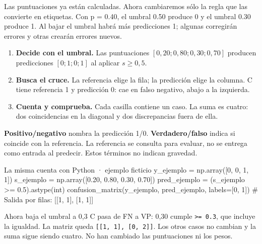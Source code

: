\label{bloque-8}

Las puntuaciones ya están calculadas. Ahora cambiaremos sólo la regla que las convierte en etiquetas. Con p = 0.40, el umbral 0.50 produce 0 y el umbral 0.30 produce 1. Al bajar el umbral habrá más predicciones 1; algunas corregirán errores y otras crearán errores nuevos.


\begin{enumerate}
\item \textbf{Decide con el umbral.} Las puntuaciones \([0,20;0,80;0,30;0,70]\) producen predicciones \([0;1;0;1]\) al aplicar \(s\geq0,5\).
\item \textbf{Busca el cruce.} La referencia elige la fila; la predicción elige la columna. C tiene referencia 1 y predicción 0: cae en falso negativo, abajo a la izquierda.
\item \textbf{Cuenta y comprueba.} Cada casilla contiene un caso. La suma es cuatro: dos coincidencias en la diagonal y dos discrepancias fuera de ella.
\end{enumerate}
\textbf{Positivo/negativo} nombra la predicción 1/0. \textbf{Verdadero/falso} indica si coincide con la referencia. La referencia se consulta para evaluar, no se entrega como entrada al predecir. Estos términos no indican gravedad.
\begin{Codigo}{La misma cuenta con Python · ejemplo ficticio}
y_ejemplo = np.array([0, 0, 1, 1])
s_ejemplo = np.array([0.20, 0.80, 0.30, 0.70])
pred_ejemplo = (s_ejemplo >= 0.5).astype(int)
confusion_matrix(y_ejemplo, pred_ejemplo, labels=[0, 1])
# Salida por filas: [[1, 1], [1, 1]]
\end{Codigo}
\begin{Practica}{Ahora baja el umbral a 0,3}
C pasa de FN a VP: 0,30 cumple \texttt{>= 0.3}, que incluye la igualdad. La matriz queda \texttt{[[1, 1], [0, 2]]}. Los otros casos no cambian y la suma sigue siendo cuatro. No han cambiado las puntuaciones ni los pesos.
\end{Practica}



\label{paso-8a}

